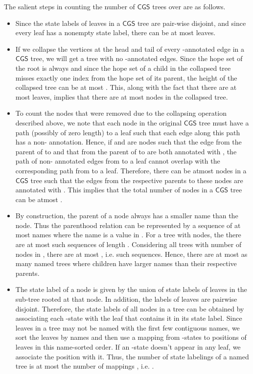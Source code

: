 \documentclass[3p]{elsarticle}
\newcommand{\CGS}{\ensuremath{\textsf{CGS }}}
\begin{document}
The salient steps in counting the number of \CGS trees over 
are as follows.
\begin{itemize}
\item Since the state labels of leaves in a \CGS tree are pair-wise
  disjoint, and since every leaf has a nonempty state label, there can
  be at most  leaves.

\item If we collapse the vertices at the head and tail of every
  -annotated edge in a \CGS tree, we will get a tree with no
  -annotated edges.  Since the hope set of the root is always 
  and since the hope set of a child in the collapsed tree misses
  exactly one index from the hope set of its parent, the height of the
  collapsed tree can be at most .  This, along with the fact that
  there are at most  leaves, implies that there are at most  nodes in the collapsed tree.

\item To count the nodes that were removed due to the collapsing
  operation described above, we note that each node in the original
  \CGS tree must have a path (possibly of zero length) to a leaf such
  that each edge along this path has a non- annotation.  Hence, if
   and  are nodes such that the edge from the parent of  to
   and that from the parent of  to  are both annotated with
  , the path of non- annotated edges from  to a leaf cannot
  overlap with the corresponding path from  to a leaf.  Therefore,
  there can be atmost  nodes in a \CGS tree such that the edges
  from the respective parents to these nodes are annotated with .
  This implies that the total number of nodes in a \CGS tree can be
  atmost .

\item By construction, the parent of a node always has a smaller name
  than the node. Thus the parenthood relation can be represented by a
  sequence of at most  names where the  name is a value
  in .  For a tree with  nodes, the there are at
  most  such sequences of length . Considering all
  trees with number of nodes in , there are at most
  , i.e.  such sequences.  Hence,
  there are at most as many named trees where children have larger
  names than their respective parents.

\item The state label of a node is given by the union of state labels
  of leaves in the sub-tree rooted at that node.  In addition, the
  labels of leaves are pairwise disjoint. Therefore, the state labels
  of all nodes in a tree can be obtained by associating each
  -state with the leaf that contains it in its state label.
  Since leaves in a tree may not be named with the first few
  contiguous names, we sort the leaves by names and then use a mapping
  from -states to positions of leaves in this name-sorted order.
  If an -state doesn't appear in any leaf, we associate the
  position  with it.  Thus, the number of state labelings of a
  named tree is at most the number of mappings , i.e.  .





\end{itemize}
\end{document}
